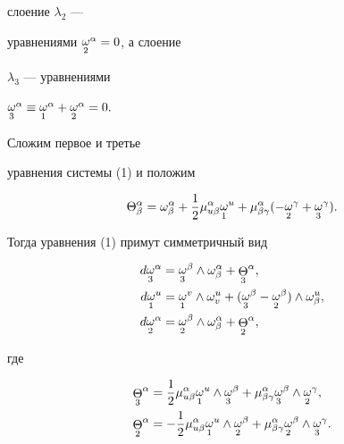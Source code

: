слоение $\lambda_{2}$ ---


уравнениями ${\displaystyle{\mathop{\omega}_{2}}}^{\alpha}=0$, а слоение


$\lambda_{3}$ --- уравнениями


${\displaystyle{\mathop{\omega}_{3}}}^{\alpha} \equiv {\displaystyle{\mathop{\omega}_{1}}}^{\alpha}+{\displaystyle{\mathop{\omega}_{2}}}^{\alpha}=0.$





Сложим первое и третье


уравнения системы (1) и положим


$$


\Theta^{\alpha}_{\beta}=\omega^{\alpha}_{\beta}+\frac{1}{2}


\mu^{\alpha}_{u \beta}{\crazy{\omega}{1}}^{u}+


\mu^{\alpha}_{\beta \gamma}(-{\crazy{\omega}{2}}^{\gamma}+


{\crazy{\omega}{3}}^{\gamma}).


$$


Тогда уравнения (1) примут симметричный вид


\begin{align}


d{\crazy{\omega}{3}}^{\alpha}&= {\crazy{\omega}{3}}^{\beta}\wedge


\omega^{\alpha}_{\beta}+{\crazy{\Theta}{3}}^{\alpha},\notag\\


%


d{\crazy{\omega}{1}}^{u}&= {\crazy{\omega}{1}}^{v}\wedge \omega^{u}_{v}+


({\crazy{\omega}{3}}^{\beta}-{\crazy{\omega}{2}}^{\beta})


\wedge \omega^{u}_{\beta},\\


%


d{\crazy{\omega}{2}}^{\alpha}&={\crazy{\omega}{2}}^{\beta}\wedge


\omega^{\alpha}_{\beta}+{\crazy{\Theta}{2}}^{\alpha},\notag


\end{align}


где


\begin{align*}


{\crazy{\Theta}{3}}^{\alpha}&=\dfrac{1}{2} \mu^{\alpha}_{u \beta}


{\crazy{\omega}{1}}^{u}\wedge{\crazy{\omega}{3}}^{\beta}


+\mu^{\alpha}_{\beta \gamma}{\crazy{\omega}{3}}^{\beta}\wedge


{\crazy{\omega}{2}}^{\gamma},\\


%


{\crazy{\Theta}{2}}^{\alpha}&=-\dfrac{1}{2} \mu^{\alpha}_{u \beta}


{\crazy{\omega}{1}}^{u}\wedge{\crazy{\omega}{2}}^{\beta}


+\mu^{\alpha}_{\beta \gamma}{\crazy{\omega}{2}}^{\beta}\wedge


{\crazy{\omega}{3}}^{\gamma}.


\end{align*}






